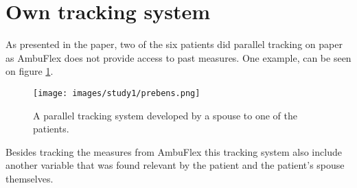 \section{Own tracking system}

As presented in the paper, two of the six patients did parallel tracking on paper as AmbuFlex does not provide access to past measures. One example, can be seen on figure \ref{fig:paperSystem}.

\begin{figure}[h]
\centering
\texttt{[image: images/study1/prebens.png]}
\caption{A parallel tracking system developed by a spouse to one of the patients.}
\label{fig:paperSystem}
\end{figure}

Besides tracking the measures from AmbuFlex this tracking system also include another variable that was found relevant by the patient and the patient's spouse themselves.

%